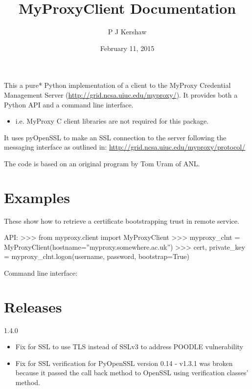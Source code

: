 \documentclass[letterpaper,10pt,english]{sphinxmanual}
\title{MyProxyClient Documentation}
\date{February 11, 2015}
\author{P J Kershaw}
\begin{document}
\maketitle
\tableofcontents
{}\label{README::doc}


This a pure* Python implementation of a client to the MyProxy Credential
Management Server (\href{http://grid.ncsa.uiuc.edu/myproxy/}{http://grid.ncsa.uiuc.edu/myproxy/}).  It provides both a
Python API and a command line interface.
\begin{itemize}
\item {} 
i.e. MyProxy C client libraries are not required for this package.

\end{itemize}

It uses pyOpenSSL to make an SSL connection to the server following the
messaging interface as outlined in: \href{http://grid.ncsa.uiuc.edu/myproxy/protocol/}{http://grid.ncsa.uiuc.edu/myproxy/protocol/}

The code is based on an original program  by Tom Uram of ANL.


\chapter{Examples}
\label{README:examples}\label{README:myproxy-client-package}
These show how to retrieve a certificate bootstrapping trust in remote service.

API:
\textgreater{}\textgreater{}\textgreater{} from myproxy.client import MyProxyClient
\textgreater{}\textgreater{}\textgreater{} myproxy\_clnt = MyProxyClient(hostname=''myproxy.somewhere.ac.uk'')
\textgreater{}\textgreater{}\textgreater{} cert, private\_key = myproxy\_clnt.logon(username, password, bootstrap=True)

Command line interface:



\chapter{Releases}
\label{README:releases}
1.4.0
\begin{itemize}
\item {} 
Fix for SSL to use TLS instead of SSLv3 to address POODLE vulnerability

\item {} 
Fix for SSL verification for PyOpenSSL version 0.14 - v1.3.1 was broken
because it passed the call back method to OpenSSL using verification classes'
 method.

\end{itemize}
\end{document}
